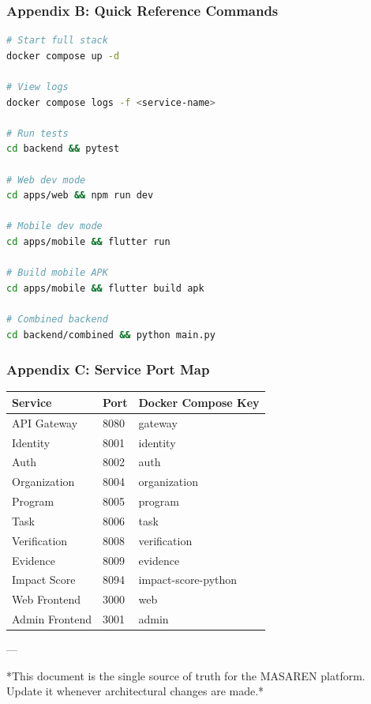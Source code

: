 \documentclass[11pt,a4paper]{article}
\begin{document}
\subsubsection{Appendix B: Quick Reference Commands}

\begin{lstlisting}[language=bash, caption=bash code]
# Start full stack
docker compose up -d

# View logs
docker compose logs -f <service-name>

# Run tests
cd backend && pytest

# Web dev mode
cd apps/web && npm run dev

# Mobile dev mode
cd apps/mobile && flutter run

# Build mobile APK
cd apps/mobile && flutter build apk

# Combined backend
cd backend/combined && python main.py
\end{lstlisting}

\subsubsection{Appendix C: Service Port Map}

\begin{table}[H]
\centering
\begin{tabular}{|l|l|l|}
\hline
Service & Port & Docker Compose Key \\
\hline
API Gateway & 8080 & gateway \\
\hline
Identity & 8001 & identity \\
\hline
Auth & 8002 & auth \\
\hline
Organization & 8004 & organization \\
\hline
Program & 8005 & program \\
\hline
Task & 8006 & task \\
\hline
Verification & 8008 & verification \\
\hline
Evidence & 8009 & evidence \\
\hline
Impact Score & 8094 & impact-score-python \\
\hline
Web Frontend & 3000 & web \\
\hline
Admin Frontend & 3001 & admin \\
\hline
\end{tabular}
\end{table}

---


*This document is the single source of truth for the MASAREN platform. Update it whenever architectural changes are made.*
\end{document}
